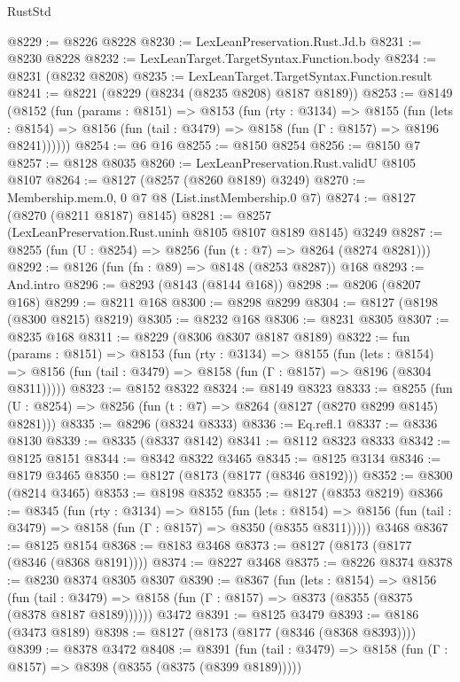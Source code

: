 \begin{lexlean}{RustStd}
\begin{coremodule}
@8229 := @8226 @8228
@8230 := LexLeanPreservation.Rust.Jd.b
@8231 := @8230 @8228
@8232 := LexLeanTarget.TargetSyntax.Function.body
@8234 := @8231 (@8232 @8208)
@8235 := LexLeanTarget.TargetSyntax.Function.result
@8241 := @8221 (@8229 (@8234 (@8235 @8208) @8187 @8189))
@8253 := @8149
    (@8152
      (fun (params : @8151) =>
      @8153
        (fun (rty : @3134) =>
        @8155
          (fun (lets : @8154) =>
          @8156 (fun (tail : @3479) => @8158 (fun (Γ : @8157) => @8196 @8241))))))
@8254 := @6 @16
@8255 := @8150 @8254
@8256 := @8150 @7
@8257 := @8128 @8035
@8260 := LexLeanPreservation.Rust.validU @8105 @8107
@8264 := @8127 (@8257 (@8260 @8189) @3249)
@8270 := Membership.mem.{0, 0} @7 @8 (List.instMembership.{0} @7)
@8274 := @8127 (@8270 (@8211 @8187) @8145)
@8281 := @8257 (LexLeanPreservation.Rust.uninh @8105 @8107 @8189 @8145) @3249
@8287 := @8255 (fun (U : @8254) => @8256 (fun (t : @7) => @8264 (@8274 @8281)))
@8292 := @8126 (fun (fn : @89) => @8148 (@8253 @8287)) @168
@8293 := And.intro
@8296 := @8293 (@8143 (@8144 @168))
@8298 := @8206 (@8207 @168)
@8299 := @8211 @168
@8300 := @8298 @8299
@8304 := @8127 (@8198 (@8300 @8215) @8219)
@8305 := @8232 @168
@8306 := @8231 @8305
@8307 := @8235 @168
@8311 := @8229 (@8306 @8307 @8187 @8189)
@8322 := fun (params : @8151) =>
  @8153
    (fun (rty : @3134) =>
    @8155
      (fun (lets : @8154) =>
      @8156 (fun (tail : @3479) => @8158 (fun (Γ : @8157) => @8196 (@8304 @8311)))))
@8323 := @8152 @8322
@8324 := @8149 @8323
@8333 := @8255 (fun (U : @8254) => @8256 (fun (t : @7) => @8264 (@8127 (@8270 @8299 @8145) @8281)))
@8335 := @8296 (@8324 @8333)
@8336 := Eq.refl.{1}
@8337 := @8336 @8130
@8339 := @8335 (@8337 @8142)
@8341 := @8112 @8323 @8333
@8342 := @8125 @8151
@8344 := @8342 @8322 @3465
@8345 := @8125 @3134
@8346 := @8179 @3465
@8350 := @8127 (@8173 (@8177 (@8346 @8192)))
@8352 := @8300 (@8214 @3465)
@8353 := @8198 @8352
@8355 := @8127 (@8353 @8219)
@8366 := @8345
    (fun (rty : @3134) =>
    @8155
      (fun (lets : @8154) =>
      @8156 (fun (tail : @3479) => @8158 (fun (Γ : @8157) => @8350 (@8355 @8311)))))
    @3468
@8367 := @8125 @8154
@8368 := @8183 @3468
@8373 := @8127 (@8173 (@8177 (@8346 (@8368 @8191))))
@8374 := @8227 @3468
@8375 := @8226 @8374
@8378 := @8230 @8374 @8305 @8307
@8390 := @8367
    (fun (lets : @8154) =>
    @8156
      (fun (tail : @3479) => @8158 (fun (Γ : @8157) => @8373 (@8355 (@8375 (@8378 @8187 @8189))))))
    @3472
@8391 := @8125 @3479
@8393 := @8186 (@3473 @8189)
@8398 := @8127 (@8173 (@8177 (@8346 (@8368 @8393))))
@8399 := @8378 @3472
@8408 := @8391
    (fun (tail : @3479) => @8158 (fun (Γ : @8157) => @8398 (@8355 (@8375 (@8399 @8189)))))

\end{coremodule}
\end{lexlean}
